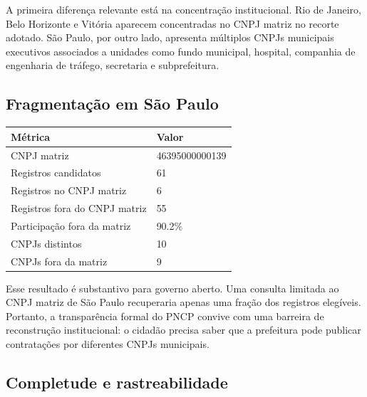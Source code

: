 \documentclass[12pt]{article}
\newcounter{none}
\begin{document}
A primeira diferença relevante está na concentração institucional. Rio
de Janeiro, Belo Horizonte e Vitória aparecem concentradas no CNPJ
matriz no recorte adotado. São Paulo, por outro lado, apresenta
múltiplos CNPJs municipais executivos associados a unidades como fundo
municipal, hospital, companhia de engenharia de tráfego, secretaria e
subprefeitura.

\subsection{Fragmentação em São
Paulo}\label{fragmentauxe7uxe3o-em-suxe3o-paulo}

{\def\LTcaptype{none} %
\begin{longtable}[]{@{}ll@{}}
\toprule\noalign{}
Métrica & Valor \\
\midrule\noalign{}
\endhead
\bottomrule\noalign{}
\endlastfoot
CNPJ matriz & 46395000000139 \\
Registros candidatos & 61 \\
Registros no CNPJ matriz & 6 \\
Registros fora do CNPJ matriz & 55 \\
Participação fora da matriz & 90.2\% \\
CNPJs distintos & 10 \\
CNPJs fora da matriz & 9 \\
\end{longtable}
}

Esse resultado é substantivo para governo aberto. Uma consulta limitada
ao CNPJ matriz de São Paulo recuperaria apenas uma fração dos registros
elegíveis. Portanto, a transparência formal do PNCP convive com uma
barreira de reconstrução institucional: o cidadão precisa saber que a
prefeitura pode publicar contratações por diferentes CNPJs municipais.

\subsection{Completude e
rastreabilidade}\label{completude-e-rastreabilidade}
\end{document}
